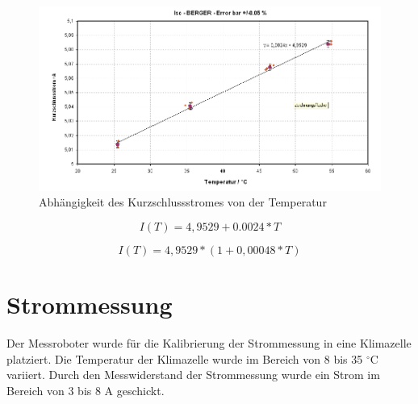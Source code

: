 \documentclass[a4paper,bibtotoc,oneside]{scrbook}
\begin{document}
\begin{figure}[htbp]
\centering
\includegraphics[width=150mm]{img/Isc.png}
\caption{Abhängigkeit des Kurzschlussstromes von der Temperatur}\label{tempkoef}
\end{figure}

  \begin{equation}
     I(T) = 4,9529+0.0024 \ast T
  \end{equation}
  
    \begin{equation}
     I(T) = 4,9529 \ast ( 1 + 0,00048 \ast T)
  \end{equation}

\section{Strommessung}\thispagestyle{empty}

Der Messroboter wurde für die Kalibrierung der Strommessung in eine Klimazelle platziert.  Die Temperatur der Klimazelle wurde im Bereich von 8 bis 35 $^{\circ}$C variiert. Durch den Messwiderstand der Strommessung wurde ein Strom im Bereich von 3 bis 8 A geschickt.  
\end{document}
